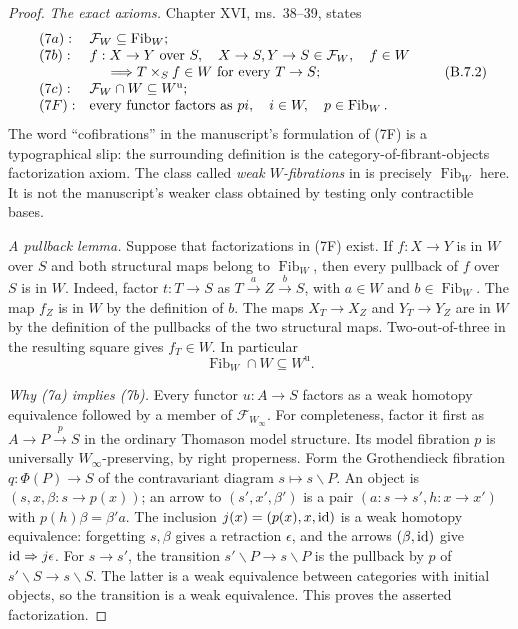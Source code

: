 \begin{proof}
\emph{The exact axioms.}
Chapter XVI, ms.~38--39, states
\[
\begin{array}{ll}
 (7a):&\mathcal F_W\subseteq\operatorname{Fib}_W;\\
 (7b):& f:X\to Y\text{ over }S,\quad
 X\to S,Y\to S\in\mathcal F_W,\quad f\in W\\
 &\hspace{1.5em}\Longrightarrow
    T\times_Sf\in W\text{ for every }T\to S;\\
 (7c):&\mathcal F_W\cap W\subseteq W^{\mathrm u};\\
 (7F):&\text{every functor factors as }p i,
       \quad i\in W,\quad p\in\operatorname{Fib}_W.
\end{array}
\tag{B.7.2}
\]
The word ``cofibrations'' in the manuscript's formulation
of (7F) is a typographical slip: the surrounding definition
is the category-of-fibrant-objects factorization axiom.
The class called \emph{weak $W$-fibrations} in
\citet[Definition~6.1.13]{Cisinski2006} is precisely
$\operatorname{Fib}_W$ here. It is not the manuscript's
weaker class obtained by testing only contractible bases.

\emph{A pullback lemma.}
Suppose that factorizations in (7F) exist. If
$f:X\to Y$ is in $W$ over $S$ and both structural maps
belong to $\operatorname{Fib}_W$, then every pullback
of $f$ over $S$ is in $W$. Indeed, factor $t:T\to S$
as $T\xrightarrow{a}Z\xrightarrow{b}S$, with
$a\in W$ and $b\in\operatorname{Fib}_W$.
The map $f_Z$ is in $W$ by the definition of $b$.
The maps $X_T\to X_Z$ and $Y_T\to Y_Z$ are in $W$
by the definition of the pullbacks of the two structural
maps. Two-out-of-three in the resulting square gives
$f_T\in W$. In particular
\[
 \operatorname{Fib}_W\cap W\subseteq W^{\mathrm u}.
\tag{B.7.3}
\]

\emph{Why (7a) implies (7b).}
Every functor $u:A\to S$ factors as a weak homotopy
equivalence followed by a member of $\mathcal F_{W_\infty}$.
For completeness, factor it first as
$A\to P\xrightarrow{p}S$ in the ordinary Thomason model
structure. Its model fibration $p$ is universally
$W_\infty$-preserving, by right properness. Form the
Grothendieck fibration $q:\Phi(P)\to S$ of the
contravariant diagram $s\mapsto s\backslash P$.
An object is $(s,x,\beta:s\to p(x))$; an arrow to
$(s',x',\beta')$ is a pair $(a:s\to s',h:x\to x')$
with $p(h)\beta=\beta'a$. The inclusion
$j(x)=(p(x),x,\mathrm{id})$ is a weak homotopy equivalence:
forgetting $s,\beta$ gives a retraction $\epsilon$,
and the arrows $(\beta,\mathrm{id})$ give
$\mathrm{id}\Rightarrow j\epsilon$.
For $s\to s'$, the transition
$s'\backslash P\to s\backslash P$ is the pullback
by $p$ of $s'\backslash S\to s\backslash S$.
The latter is a weak equivalence between categories
with initial objects, so the transition is a weak
equivalence. This proves the asserted factorization.


\end{proof}
